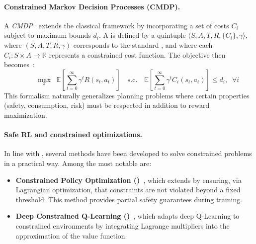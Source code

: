         \paragraph{Constrained Markov Decision Processes (CMDP).}
        A \textit{CMDP}~\cite{altman1999constrained} extends the classical  framework by incorporating
        a set of costs $C_i$ subject to maximum bounds $d_i$.
        A  is defined by a quintuple
        $\langle S, A, T, R, \{C_i\}, \gamma \rangle$,
        where $(S,A,T,R,\gamma)$ corresponds to the standard , and where
        each $C_i : S \times A \rightarrow \mathbb {R}$ represents a constrained cost function.
        The objective then becomes~:
        \[
          \hspace{1cm}\max_{\pi} \;\; \mathbb{E}\!\left[\sum_{t=0}^\infty \gamma^t R(s_t,a_t)\right]
          \quad \text {s.c.} \quad
          \mathbb{E}\!\left[\sum_{t=0}^\infty \gamma^t C_i(s_t,a_t)\right] \leq d_i, \;\; \forall i
        \]
        This formalism naturally generalizes planning problems where certain properties
        (safety, consumption, risk) must be respected in addition to reward maximization.

        \paragraph{Safe RL and constrained optimizations.}
        In line with , several methods have been developed to solve constrained problems in a practical way.
        Among the most notable are:
        \begin{itemize}
          \item \textbf{Constrained Policy Optimization ()}~\cite{achiam2017constrained},
                which extends  by ensuring,
                via Lagrangian optimization, that constraints are
                not violated beyond a fixed threshold.
                This method provides partial safety guarantees during training.
          \item \textbf{Deep Constrained Q-Learning ()}~\cite{kalweit2020deep},
                which adapts deep Q-Learning to constrained environments
                by integrating Lagrange multipliers into the approximation
                of the value function.
        \end{itemize}


